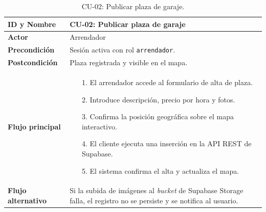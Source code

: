 \begin{table}[htbp]
\centering
\caption{CU-02: Publicar plaza de garaje.}
\label{tab:cu-02}
\begin{tabularx}{\textwidth}{|>{\columncolor{gray!15}\bfseries}l|X|}
\hline
ID y Nombre    & CU-02: Publicar plaza de garaje \\ \hline
Actor          & Arrendador \\ \hline
Precondición   & Sesión activa con rol \texttt{arrendador}. \\ \hline
Postcondición  & Plaza registrada y visible en el mapa. \\ \hline
Flujo principal &
\begin{itemize}[leftmargin=3mm, itemsep=0mm, topsep=1mm]
\item[1.] El arrendador accede al formulario de alta de plaza.
\item[2.] Introduce descripción, precio por hora y fotos.
\item[3.] Confirma la posición geográfica sobre el mapa interactivo.
\item[4.] El cliente ejecuta una inserción en la API REST de Supabase.
\item[5.] El sistema confirma el alta y actualiza el mapa.
\end{itemize} \\ \hline
Flujo alternativo & Si la subida de imágenes al \textit{bucket} de Supabase Storage falla, el registro no se persiste y se notifica al usuario. \\ \hline
\end{tabularx}
\end{table}

